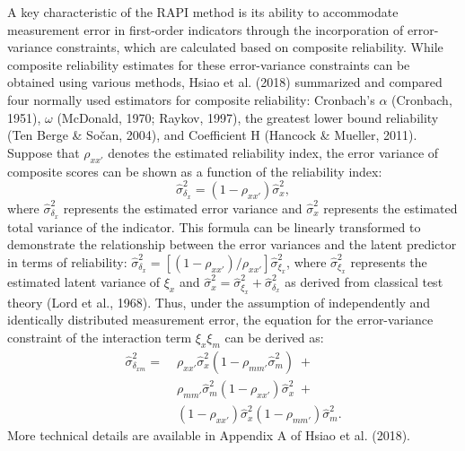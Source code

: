 \documentclass[
  man]{apa6}
\begin{document}
A key characteristic of the RAPI method is its ability to accommodate measurement error in first-order indicators through the incorporation of error-variance constraints, which are calculated based on composite reliability. While composite reliability estimates for these error-variance constraints can be obtained using various methods, Hsiao et al. (2018) summarized and compared four normally used estimators for composite reliability: Cronbach's \(\alpha\) (Cronbach, 1951), \(\omega\) (McDonald, 1970; Raykov, 1997), the greatest lower bound reliability (Ten Berge \& Sočan, 2004), and Coefficient H (Hancock \& Mueller, 2011). Suppose that \(\rho_{xx'}\) denotes the estimated reliability index, the error variance of composite scores can be shown as a function of the reliability index:
\begin{equation}
\hat{\sigma}^2_{\delta_{x}} = (1 - \rho_{xx'})\hat{\sigma}^2_{{x}},
\end{equation}
where \(\hat{\sigma}^2_{\delta_{x}}\) represents the estimated error variance and \(\hat{\sigma}^2_{{x}}\) represents the estimated total variance of the indicator. This formula can be linearly transformed to demonstrate the relationship between the error variances and the latent predictor in terms of reliability: \(\hat{\sigma}_{\delta_{x}}^2 = [(1 - \rho_{xx'})/{\rho_{xx'}}]\hat{\sigma}^2_{\xi_{x}}\), where \(\hat{\sigma}^2_{\xi_{x}}\) represents the estimated latent variance of \(\xi_{x}\) and \(\hat{\sigma}^2_{{x}} = {\hat{\sigma}^2_{\xi_{x}} + \hat{\sigma}^2_{\delta_{x}}}\) as derived from classical test theory (Lord et al., 1968). Thus, under the assumption of independently and identically distributed measurement error, the equation for the error-variance constraint of the interaction term \(\xi_{x}\xi_{m}\) can be derived as:
\begin{equation}
\begin{aligned}
\hat{\sigma}^2_{\delta_{xm}} =\; & \rho_{xx'}\hat{\sigma}^2_{{x}}(1 - \rho_{mm'}\hat{\sigma}^2_{{m}})\; + \\&
                        \rho_{mm'}\hat{\sigma}^2_{{m}}(1-\rho_{xx'})\hat{\sigma}^2_{{x}}\; + \\&
                        (1 - \rho_{xx'})\hat{\sigma}^2_{{x}}(1 - \rho_{mm'})\hat{\sigma}^2_{{m}}. 
\end{aligned}
\end{equation}
More technical details are available in Appendix A of Hsiao et al. (2018).
\end{document}
